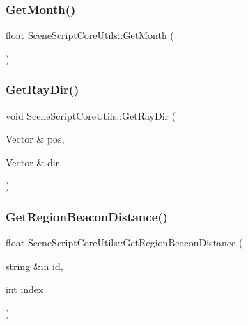 \hypertarget{class_scene_script_core_utils_a4ee852179c20abe1f58f21c8ae6d494c}{}\label{class_scene_script_core_utils_a4ee852179c20abe1f58f21c8ae6d494c} 
\subsubsection{\texorpdfstring{Get\+Month()}{GetMonth()}}
{\footnotesize\ttfamily float Scene\+Script\+Core\+Utils\+::\+Get\+Month (\begin{DoxyParamCaption}{ }\end{DoxyParamCaption})}

\hypertarget{class_scene_script_core_utils_a0fa3be6ad21276f85207db050bbe7c8d}{}\label{class_scene_script_core_utils_a0fa3be6ad21276f85207db050bbe7c8d} 
\subsubsection{\texorpdfstring{Get\+Ray\+Dir()}{GetRayDir()}}
{\footnotesize\ttfamily void Scene\+Script\+Core\+Utils\+::\+Get\+Ray\+Dir (\begin{DoxyParamCaption}\item[{Vector \&}]{pos,  }\item[{Vector \&}]{dir }\end{DoxyParamCaption})}

\hypertarget{class_scene_script_core_utils_aac5bb622b04a044a05dcd3d8b1444ff8}{}\label{class_scene_script_core_utils_aac5bb622b04a044a05dcd3d8b1444ff8} 
\subsubsection{\texorpdfstring{Get\+Region\+Beacon\+Distance()}{GetRegionBeaconDistance()}}
{\footnotesize\ttfamily float Scene\+Script\+Core\+Utils\+::\+Get\+Region\+Beacon\+Distance (\begin{DoxyParamCaption}\item[{string \&in}]{id,  }\item[{int}]{index }\end{DoxyParamCaption})}

